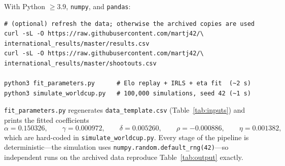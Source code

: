 With Python $\ge 3.9$, \texttt{numpy}, and \texttt{pandas}:

\begin{verbatim}
# (optional) refresh the data; otherwise the archived copies are used
curl -sL -O https://raw.githubusercontent.com/martj42/\
international_results/master/results.csv
curl -sL -O https://raw.githubusercontent.com/martj42/\
international_results/master/shootouts.csv

python3 fit_parameters.py      # Elo replay + IRLS + eta fit  (~2 s)
python3 simulate_worldcup.py   # 100,000 simulations, seed 42 (~1 s)
\end{verbatim}

\noindent
\texttt{fit\_parameters.py} regenerates \texttt{data\_template.csv}
(Table~\ref{tab:inputs}) and prints the fitted coefficients
\[
\alpha = 0.150326,\qquad
\gamma = 0.000972,\qquad
\delta = 0.005260,\qquad
\rho = -0.000886,\qquad
\eta = 0.001382,
\]
which are hard-coded in \texttt{simulate\_worldcup.py}. Every stage of the
pipeline is deterministic---the simulation uses
\texttt{numpy.random.default\_rng(42)}---so independent runs on the archived
data reproduce Table~\ref{tab:output} exactly.
